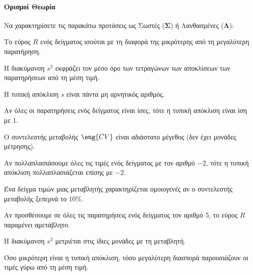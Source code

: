 \documentclass[11pt,a4paper,modern]{FFExercises}
\begin{document}

\paragraph{Ορισμοί Θεωρία}

\askhsh
Να χαρακτηρίσετε τις παρακάτω προτάσεις ως Σωστές (\textbf{Σ}) ή Λανθασμένες (\textbf{Λ}):
\begin{alist}
    \item Το εύρος $R$ ενός δείγματος ισούται με τη διαφορά της μικρότερης από τη μεγαλύτερη παρατήρηση.
    \item Η διακύμανση $s^2$ εκφράζει τον μέσο όρο των τετραγώνων των αποκλίσεων των παρατηρήσεων από τη μέση τιμή.
    \item Η τυπική απόκλιση $s$ είναι πάντα μη αρνητικός αριθμός.
    \item Αν όλες οι παρατηρήσεις ενός δείγματος είναι ίσες, τότε η τυπική απόκλιση είναι ίση με 1.
    \item Ο συντελεστής μεταβολής $\eng{CV}$ είναι αδιάστατο μέγεθος (δεν έχει μονάδες μέτρησης).
    \item Αν πολλαπλασιάσουμε όλες τις τιμές ενός δείγματος με τον αριθμό $-2$, τότε η τυπική απόκλιση πολλαπλασιάζεται επίσης με $-2$.
    \item Ένα δείγμα τιμών μιας μεταβλητής χαρακτηρίζεται ομοιογενές αν ο συντελεστής μεταβολής ξεπερνά το $10\%$.
    \item Αν προσθέσουμε σε όλες τις παρατηρήσεις ενός δείγματος τον αριθμό 5, το εύρος $R$ παραμένει αμετάβλητο.
    \item Η διακύμανση $s^2$ μετριέται στις ίδιες μονάδες με τη μεταβλητή.
    \item Όσο μικρότερη είναι η τυπική απόκλιση, τόσο μεγαλύτερη διασπορά παρουσιάζουν οι τιμές γύρω από τη μέση τιμή.
\end{alist}
\end{document}
